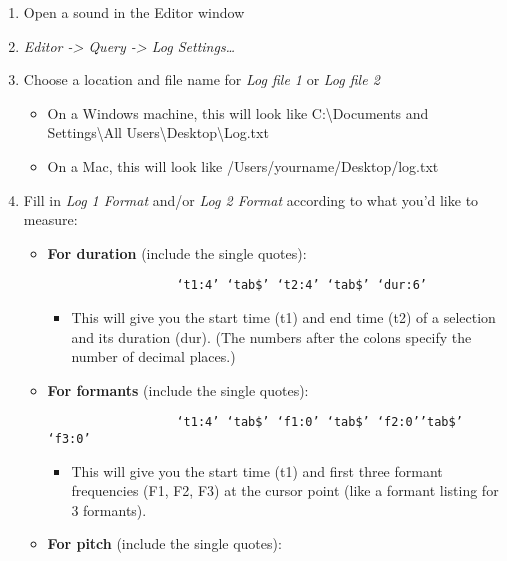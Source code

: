 \documentclass[11pt]{article}
\def\tightlist{}
\begin{document}
\begin{enumerate}
\def\labelenumi{\arabic{enumi}.}
\item
  Open a sound in the Editor window
\item
  \emph{Editor -\textgreater{} Query -\textgreater{} Log
  Settings\ldots{}}
\item
  Choose a location and file name for \emph{Log file 1} or \emph{Log
  file 2}

  \begin{itemize}
  \tightlist
  \item
    On a Windows machine, this will look like C:\textbackslash Documents
    and Settings\textbackslash All
    Users\textbackslash Desktop\textbackslash Log.txt
  \item
    On a Mac, this will look like /Users/yourname/Desktop/log.txt
  \end{itemize}
\item
  Fill in \emph{Log 1 Format} and/or \emph{Log 2 Format} according to
  what you'd like to measure:

  \begin{itemize}
  \tightlist
  \item
    \textbf{For duration} (include the single quotes):

    \begin{verbatim}
                  ‘t1:4’ ‘tab$’ ‘t2:4’ ‘tab$’ ‘dur:6’
              \end{verbatim}

    \begin{itemize}
    \tightlist
    \item
      This will give you the start time (t1) and end time (t2) of a
      selection and its duration (dur). (The numbers after the colons
      specify the number of decimal places.)
    \end{itemize}
  \item
    \textbf{For formants} (include the single quotes):

    \begin{verbatim}
                  ‘t1:4’ ‘tab$’ ‘f1:0’ ‘tab$’ ‘f2:0’’tab$’ ‘f3:0’
              \end{verbatim}

    \begin{itemize}
    \tightlist
    \item
      This will give you the start time (t1) and first three formant
      frequencies (F1, F2, F3) at the cursor point (like a formant
      listing for 3 formants).
    \end{itemize}
  \item
    \textbf{For pitch} (include the single quotes):


\end{itemize}
\end{enumerate}
\end{document}
